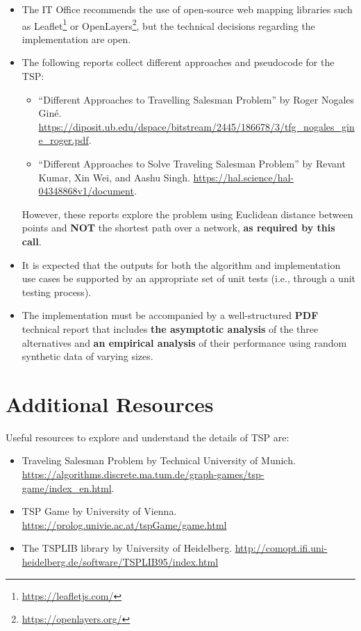 \documentclass[11pt]{article}
\begin{document}
\begin{itemize}
    \item The IT Office recommends the use of open-source web mapping libraries such as Leaflet\footnote{\url{https://leafletjs.com/}} or OpenLayers\footnote{\url{https://openlayers.org/}}, but the technical decisions regarding the implementation are open.
    \item The following reports collect different approaches and pseudocode for the TSP:
        \begin{itemize}
            \item ``Different Approaches to Travelling Salesman Problem'' by Roger Nogales Giné. \url{https://diposit.ub.edu/dspace/bitstream/2445/186678/3/tfg_nogales_gine_roger.pdf}.
            \item ``Different Approaches to Solve Traveling Salesman Problem'' by Revant Kumar, Xin Wei, and Aashu Singh. \url{https://hal.science/hal-04348868v1/document}.
        \end{itemize}
    However, these reports explore the problem using Euclidean distance between points and \textbf{NOT} the shortest path over a network, \textbf{as required by this call}.
    \item It is expected that the outputs for both the algorithm and implementation use cases be supported by an appropriate set of unit tests (i.e., through a unit testing process).
    \item The implementation must be accompanied by a well-structured \textbf{PDF} technical report that includes \textbf{the asymptotic analysis} of the three alternatives and \textbf{an empirical analysis} of their performance using random synthetic data of varying sizes.
\end{itemize}

\section{Additional Resources}

Useful resources to explore and understand the details of TSP are:
    \begin{itemize}
        \item Traveling Salesman Problem by Technical University of Munich. \url{https://algorithms.discrete.ma.tum.de/graph-games/tsp-game/index_en.html}.
        \item TSP Game by University of Vienna. \url{https://prolog.univie.ac.at/tspGame/game.html}
        \item The TSPLIB library by University of Heidelberg. \url{http://comopt.ifi.uni-heidelberg.de/software/TSPLIB95/index.html}
    \end{itemize}
\end{document}
